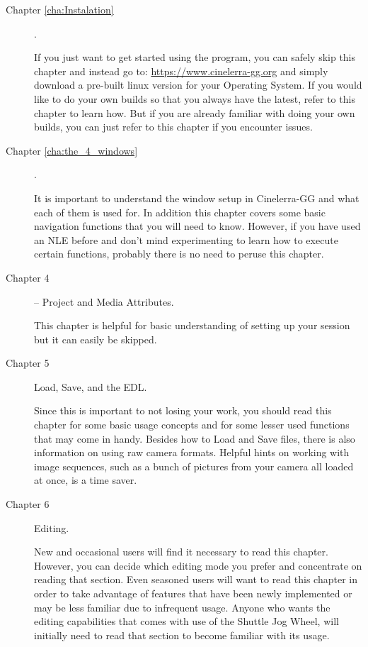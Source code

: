 \begin{description}
    \item[Chapter \ref{cha:Instalation} ] .

        If you just want to get started using the program, you can safely skip this chapter and instead go to:
        \url{https://www.cinelerra-gg.org}
        and simply download a pre-built linux version for your Operating System. If you would like to do your own builds so that you always have the latest, refer to this chapter to learn how. 
        But if you are already familiar with doing your own builds, you can just refer to this chapter if you encounter issues.
    \item[Chapter \ref{cha:the_4_windows} ] .

        It is important to understand the window setup in Cinelerra-GG and what each of them is used for. 
        In addition this chapter covers some basic navigation functions that you will need to know. 
        However, if you have used an NLE before and don’t mind experimenting to learn how to execute certain functions, probably there is no need to peruse this chapter.
    \item[Chapter 4 ] – Project and Media Attributes.

        This chapter is helpful for basic understanding of setting up your session but it can easily be skipped.

    \item[Chapter 5] Load, Save, and the EDL.

        Since this is important to not losing your work, you should read this chapter for some basic usage concepts and for some lesser used functions that may come in handy. 
        Besides how to Load and Save files, there is also information on using raw camera formats. 
        Helpful hints on working with image sequences, such as a bunch of pictures from your camera all loaded at once, is a time saver.

    \item[Chapter 6] Editing.

        New and occasional users will find it necessary to read this chapter. However, you can decide which editing mode you prefer and concentrate on reading that section. 
        Even seasoned users will want to read this chapter in order to take advantage of features that have been newly implemented or may be less familiar due to infrequent usage. 
        Anyone who wants the editing capabilities that comes with use of the Shuttle Jog Wheel, will initially need to read that section to become familiar with its usage.


\end{description}
